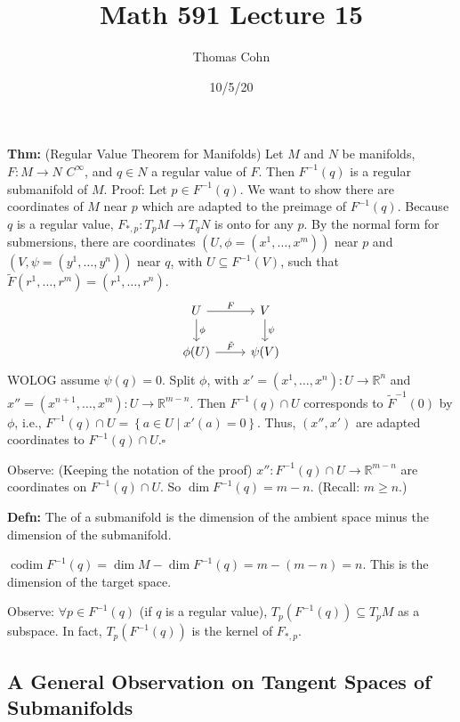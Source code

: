\documentclass[10pt,letterpaper]{article}
\author{Thomas Cohn}
\title{Math 591 Lecture 15}
\date{10/5/20} %
\newcommand{\n}{\hfill\break}
\newcommand{\nn}{\vspace{0.5\baselineskip}\n}
\newcommand{\hangblock}[2]{\par\noindent\settowidth{\hangindent}{\textbf{#1: }}\textbf{#1: }\!\!\!#2}
\newcommand{\defn}[1]{\hangblock{Defn}{#1}}
\newcommand{\thm}[1]{\hangblock{Thm}{#1}}
\newcommand{\proven}{\;$\square$\n}
\newcommand{\set}[1]{\left\{#1\right\}}
\newcommand{\reals}{\mathbb{R}}
\newcommand{\R}{\reals}
\DeclareMathOperator{\codim}{codim}
\newcommand{\inv}{^{-1}}
\let\u\relax
\newcommand{\u}[1]{\underline{#1}}
\begin{document}
\maketitle
\setlength\RaggedRightParindent{\parindent}
\RaggedRight

\thm{
	(Regular Value Theorem for Manifolds) Let $M$ and $N$ be manifolds, $F:M\to{}N$ $C^{\infty}$, and $q\in{}N$ a regular value of $F$. Then $F\inv(q)$ is a regular submanifold of $M$.\nn
	Proof: Let $p\in{}F\inv(q)$. We want to show there are coordinates of $M$ near $p$ which are adapted to the preimage of $F\inv(q)$. Because $q$ is a regular value, $F_{*,p}:T_{p}M\to{}T_{q}N$ is onto for any $p$. By the normal form for submersions, there are coordinates $(U,\phi=(x^{1},\ldots,x^{m}))$ near $p$ and $(V,\psi=(y^{1},\ldots,y^{n}))$ near $q$, with $U\subseteq{}F\inv(V)$, such that $\tilde{F}(r^{1},\ldots,r^{m})=(r^{1},\ldots,r^{n})$.
	\[
		\begin{tikzcd}[ampersand replacement=\&]
			U \arrow[r,"F"] \arrow[d,"\phi"] \& V \arrow[d,"\psi"]\\
			\phi(U) \arrow[r,"\tilde{F}"] \& \psi(V)
		\end{tikzcd}
	\]
	WOLOG assume $\psi(q)=0$. Split $\phi$, with $x'=(x^{1},\ldots,x^{n}):U\to\R^{n}$ and $x''=(x^{n+1},\ldots,x^{m}):U\to\R^{m-n}$. Then $F\inv(q)\cap{}U$ corresponds to $\tilde{F}\inv(0)$ by $\phi$, i.e., $F\inv(q)\cap{}U=\set{a\in{}U\mid{}x'(a)=0}$. Thus, $(x'',x')$ are adapted coordinates to $F\inv(q)\cap{}U$.\proven
}

\par\noindent
Observe: (Keeping the notation of the proof) $x'':F\inv(q)\cap{}U\to\R^{m-n}$ are coordinates on $F\inv(q)\cap{}U$. So $\dim{}F\inv(q)=m-n$. (Recall: $m\ge{}n$.)\n

\defn{
	The \u{codimension} of a submanifold is the dimension of the ambient space minus the dimension of the submanifold.\n
}

\par\noindent
$\codim{}F\inv(q)=\dim{}M-\dim{}F\inv(q)=m-(m-n)=n$. This is the dimension of the target space.\n

\par\noindent
Observe: $\forall{}p\in{}F\inv(q)$ (if $q$ is a regular value), $T_{p}(F\inv(q))\subseteq{}T_{p}M$ as a subspace. In fact, $T_{p}(F\inv(q))$ is the kernel of $F_{*,p}$.\n

\subsection*{A General Observation on Tangent Spaces of Submanifolds}
\end{document}
